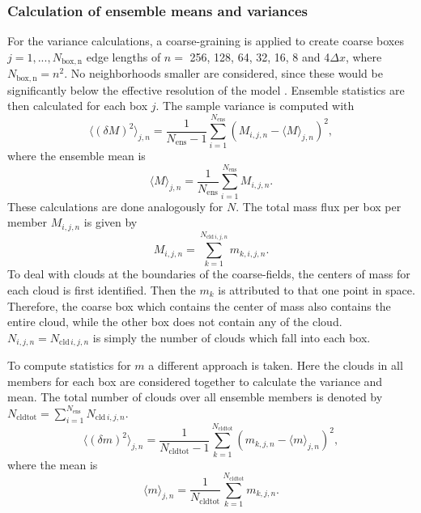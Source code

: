 \documentclass[a4paper, 12pt]{article}
\begin{document}
\subsubsection{Calculation of ensemble means and variances}
For the variance calculations, a coarse-graining is applied to create coarse boxes $j=1,...,N_{\mathrm{box,n}}$ edge lengths of $n=$ 256, 128, 64, 32, 16, 8 and 4$\Delta x$, where $N_{\mathrm{box,n}}=n^2$. No neighborhoods smaller are considered, since these would be significantly below the effective resolution of the model \citep{Bierdel2012}. Ensemble statistics are then calculated for each box $j$. The sample variance is computed with
\begin{equation} \label{eq:calc_varM}
 \langle (\delta M )^2 \rangle_{j,n} = \frac{1}{N_{\mathrm{ens}}-1} \sum_{i=1}^{N_{\mathrm{ens}}} (M_{i,j,n} - \langle M \rangle_{j,n})^2,
\end{equation}
where the ensemble mean is
\begin{equation} \label{eq:calc_meanM}
 \langle M \rangle_{j,n} = \frac{1}{N_{\mathrm{ens}}} \sum_{i=1}^{N_{\mathrm{ens}}} M_{i,j,n}.
\end{equation}
These calculations are done analogously for $N$. The total mass flux per box per member $M_{i,j,n}$ is given by
\begin{equation} \label{eq:calc_memM}
 M_{i,j,n} = \sum_{k=1}^{N_{\mathrm{cld}\,i,j,n}} m_{k,i,j,n}.
\end{equation}
To deal with clouds at the boundaries of the coarse-fields, the centers of mass for each cloud is first identified. Then the $m_k$ is attributed to that one point in space. Therefore, the coarse box which contains the center of mass also contains the entire cloud, while the other box does not contain any of the cloud. $N_{i,j,n}=N_{\mathrm{cld}\,i,j,n}$ is simply the number of clouds which fall into each box.

To compute statistics for $m$ a different approach is taken. Here the clouds in all members for each box are considered together to calculate the variance and mean. The total number of clouds over all ensemble members is denoted by $N_{\mathrm{cldtot}} = \sum_{i=1}^{N_{\mathrm{ens}}} N_{\mathrm{cld}\,i,j,n}$.
\begin{equation} \label{eq:calc_varm}
 \langle (\delta m )^2 \rangle_{j,n} = \frac{1}{N_{\mathrm{cldtot}}-1} \sum_{k=1}^{N_{\mathrm{cldtot}}} (m_{k,j,n} - \langle m \rangle_{j,n})^2,
\end{equation}
where the mean is
\begin{equation} \label{eq:calc_meanM}
 \langle m \rangle_{j,n} = \frac{1}{N_{\mathrm{cldtot}}} \sum_{k=1}^{N_{\mathrm{cldtot}}} m_{k,j,n}.
\end{equation}
\end{document}
